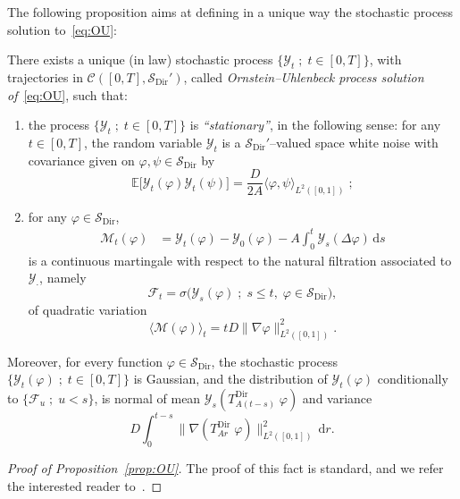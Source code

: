 \documentclass[10pt]{amsart}
\theoremstyle{definition}\newtheorem{defi}[theo]{Definition}\newtheorem{rema}[theo]{Remark}\newtheorem{exam}[theo]{Example}\newtheorem{exem}[theo]{Example}\newtheorem{nota}[theo]{Notation}
\DeclareMathOperator{\Dir}{Dir}
\newcommand{\bb}[1]{{\mathbb #1}}
\newcommand{\mc}[1]{{\mathcal #1}}
\renewcommand{\mc}[1]{{\mathcal #1}}
\newcommand{\SD}{\ensuremath{\mc S_{\Dir}}}
\renewcommand{\leq}{\leqslant}
\newcommand*{\dd}{\mathrm{d}}
\newcommand*{\dr}{\dd r}
\newcommand*{\ds}{\dd s}
\begin{document}

The following proposition aims at defining in a unique way the stochastic process solution to~\eqref{eq:OU}:

\begin{prop}\label{prop:OU}
There exists a unique (in law) stochastic process $\{\mc Y_t \; ;\; t\in[0,T]\}$, with trajectories in $\mc C([0,T],\SD')$, called \emph{Ornstein--Uhlenbeck process solution of}~\eqref{eq:OU}, such that:
\begin{enumerate}
\item \label{3.1.1} the process $\{\mc Y_t \; ; \; t \in [0,T]\}$ is \emph{``stationary''}, in the following sense: for any $t\in[0,T]$, the random variable $\mc Y_t$ is a $\SD'$--valued space white noise with covariance given on $\varphi,\psi \in \SD$ by
\[
\bb E \big[\mc Y_t(\varphi) \mc Y_t(\psi)\big] =\frac{D}{2A} \langle \varphi, \psi \rangle_{L^2([0,1])}\; ;
\]
\item \label{3.1.2} for any $\varphi \in \mc S_{\Dir}$,
\begin{align*}
\mc M_t(\varphi)&= \mc Y_t(\varphi)-\mc Y_0(\varphi) - A\int_0^t \mc Y_s(\Delta \varphi)\,\ds
\end{align*}
is a continuous martingale with respect to the natural filtration associated to $\mc Y_\cdot$, namely
\begin{equation}\label{eq:naturalfiltration}
\mc F_t=\sigma\big(\mc Y_s(\varphi)\; ; \; s \leq t, \; \varphi \in \mc S_{\Dir} \big),
\end{equation}
of quadratic variation
\[
\big\langle \mc M (\varphi) \big\rangle_t = t D \big\|\nabla \varphi\big\|^2_{L^2([0,1])}.
\]
\end{enumerate}
Moreover, for every function $\varphi \in \mc S_{\Dir}$, the stochastic process $\{\mc Y_t(\varphi)\; ; \; t \in [0,T]\}$ is Gaussian, and the distribution of $\mc Y_t(\varphi)$ conditionally to $\{\mc F_u \; ; \; u < s\}$, is normal of mean $\mc Y_s(T_{{A(t-s)}}^{\Dir}\; \varphi)$ and variance
\[
{D} \int_0^{t-s}\big\|\nabla (T_{{A}r}^{\Dir} \; \varphi) \big\|^2_{L^2([0,1])} \,\dr.
\]
\end{prop}

\begin{proof}[Proof of Proposition~\ref{prop:OU}]
The proof of this fact is standard, and we refer the interested reader to~\cite{kl,LMO}.
\end{proof}
\end{document}
